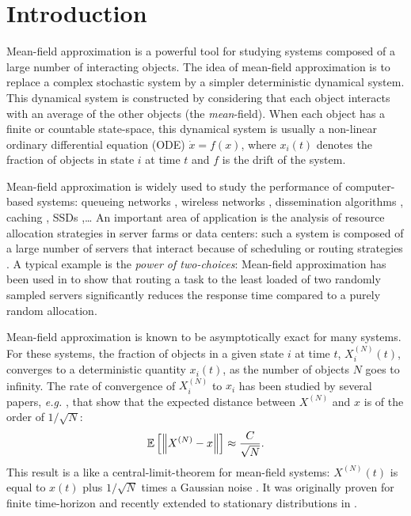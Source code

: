 \documentclass[acmlarge]{acmart}
\newcommand\XN{X^{(N)}}
\newcommand\esp[1]{{\mathchoice{\besp{#1}}{\sesp{#1}}{\sesp{#1}}{\sesp{#1}}}}
\newcommand\besp[1]{\mathbb{E}\left[#1\right]}
\newcommand\sesp[1]{\mathbb{E}[#1]}
\newcommand\norm[1]{{\mathchoice{\bnorm{#1}}{\snorm{#1}}{\snorm{#1}}{\snorm{#1}}}}
\newcommand\bnorm[1]{\left\|#1\right\|}
\newcommand\snorm[1]{\|#1\|}
\begin{document}


\maketitle

\section{Introduction}

Mean-field approximation is a powerful tool for studying systems
composed of a large number of interacting objects. The idea of
mean-field approximation is to replace a complex stochastic system by
a simpler deterministic dynamical system.  This dynamical system is
constructed by considering that each object interacts with an average
of the other objects (the \emph{mean}-field). When each object has a
finite or countable state-space, this dynamical system is usually a
non-linear ordinary differential equation (ODE) $\dot{x}=f(x)$, where
$x_i(t)$ denotes the fraction of objects in state $i$ at time $t$ and
$f$ is the drift of the system.

Mean-field approximation is widely used to study the performance of
computer-based systems: queueing networks \cite{baccelli1992mean},
wireless networks \cite{cecchi2015mean}, dissemination algorithms
\cite{chaintreau2009age}, caching \cite{gast2015transient}, SSDs
\cite{van2013mean},\dots{} An important area of application is the
analysis of resource allocation strategies in server farms or data
centers: such a system is composed of a large number of servers that
interact because of scheduling or routing strategies
\cite{gast2010mean,lu2011join,mitzenmacher1996power,tsitsiklis2011power,vvedenskaya1996queueing,minnebo2014fair}.
A typical example is the \emph{power of two-choices}: Mean-field
approximation has been used in
\cite{mitzenmacher1996power,vvedenskaya1996queueing} to show that
routing a task to the least loaded of two randomly sampled servers
significantly reduces the response time compared to a purely random
allocation.

Mean-field approximation is known to be asymptotically exact for many
systems. For these systems, the fraction of objects in a given state
$i$ at time $t$, $\XN_i(t)$, converges to a deterministic quantity
$x_i(t)$, as the number of objects $N$ goes to infinity.  The rate of
convergence of $\XN_i$ to $x_i$ has been studied by several papers,
\emph{e.g.}  \cite{benaim2008class,kurtz70,ying2016rate}, that show
that the expected distance between $\XN$ and $x$ is of the order of
$1/\sqrt{N}$:
\begin{align}
  \label{eq:1/sqrt{N}}
  \esp{\norm{\XN-x}} \approx \frac{C}{\sqrt{N}}.
\end{align}
This result is a like a central-limit-theorem for mean-field systems:
$\XN(t)$ is equal to $x(t)$ plus $1/\sqrt{N}$ times a Gaussian noise
\cite{kurtz70}. It was originally proven for finite time-horizon and
recently extended to stationary distributions in \cite{ying2016rate}.
\end{document}
